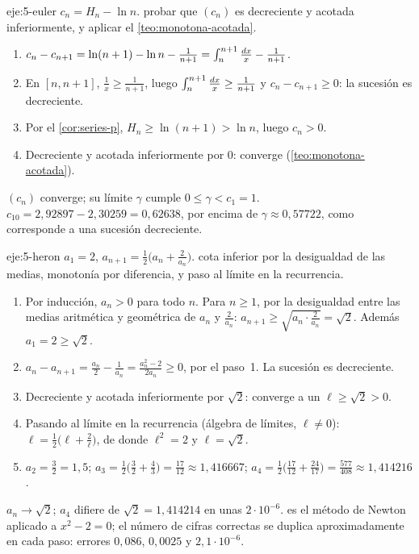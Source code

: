 \begin{solucion}{eje:5-euler}
\datos $c_n=H_n-\ln n$.
\planteamiento probar que $(c_n)$ es decreciente y acotada inferiormente, y aplicar el \cref{teo:monotona-acotada}.
\pasos
\begin{enumerate}[label=\arabic*.]
  \item $c_n-c_{n+1}=\ln(n+1)-\ln n-\frac{1}{n+1}=\int_n^{n+1}\frac{\mathop{}\!d x}{x}-\frac{1}{n+1}$.
  \item En $[n,n+1]$, $\frac1x\ge\frac{1}{n+1}$, luego $\int_n^{n+1}\frac{\mathop{}\!d x}{x}\ge\frac{1}{n+1}$ y $c_n-c_{n+1}\ge0$: la sucesión es decreciente.
  \item Por el \cref{cor:series-p}, $H_n\ge\ln(n+1)>\ln n$, luego $c_n>0$.
  \item Decreciente y acotada inferiormente por $0$: converge (\cref{teo:monotona-acotada}).
\end{enumerate}
\resultado $(c_n)$ converge; su límite $\gamma$ cumple $0\le\gamma<c_1=1$.
\comprobacion $c_{10}=2{,}92897-2{,}30259=0{,}62638$, por encima de $\gamma\approx0{,}57722$, como corresponde a una sucesión decreciente.
\end{solucion}

\begin{solucion}{eje:5-heron}
\datos $a_1=2$, $a_{n+1}=\frac12\bigl(a_n+\frac{2}{a_n}\bigr)$.
\planteamiento cota inferior por la desigualdad de las medias, monotonía por diferencia, y paso al límite en la recurrencia.
\pasos
\begin{enumerate}[label=\arabic*.]
  \item Por inducción, $a_n>0$ para todo $n$. Para $n\ge1$, por la desigualdad entre las medias aritmética y geométrica de $a_n$ y $\frac{2}{a_n}$: $a_{n+1}\ge\sqrt{a_n\cdot\frac{2}{a_n}}=\sqrt2$. Además $a_1=2\ge\sqrt2$.
  \item $a_n-a_{n+1}=\frac{a_n}{2}-\frac{1}{a_n}=\frac{a_n^{2}-2}{2a_n}\ge0$, por el paso~1. La sucesión es decreciente.
  \item Decreciente y acotada inferiormente por $\sqrt2$: converge a un $\ell\ge\sqrt2>0$.
  \item Pasando al límite en la recurrencia (álgebra de límites, $\ell\neq0$): $\ell=\frac12\bigl(\ell+\frac2\ell\bigr)$, de donde $\ell^{2}=2$ y $\ell=\sqrt2$.
  \item $a_2=\frac32=1{,}5$; $a_3=\frac12\bigl(\frac32+\frac43\bigr)=\frac{17}{12}\approx1{,}416667$; $a_4=\frac12\bigl(\frac{17}{12}+\frac{24}{17}\bigr)=\frac{577}{408}\approx1{,}414216$.
\end{enumerate}
\resultado $a_n\to\sqrt2$; $a_4$ difiere de $\sqrt2=1{,}414214$ en unas $2\cdot10^{-6}$.
\comprobacion es el método de Newton aplicado a $x^{2}-2=0$; el número de cifras correctas se duplica aproximadamente en cada paso: errores $0{,}086$, $0{,}0025$ y $2{,}1\cdot10^{-6}$.
\end{solucion}

